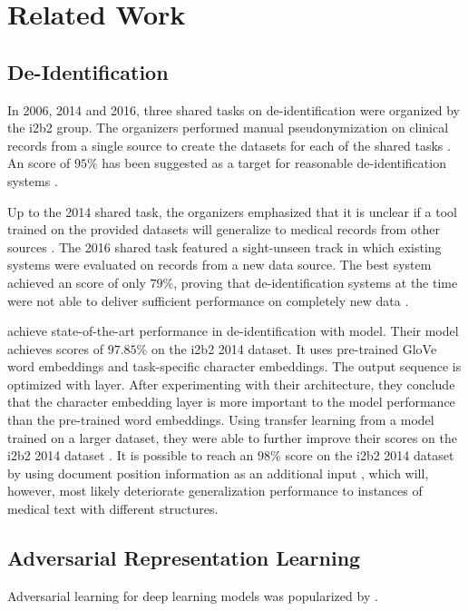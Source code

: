 
\section{Related Work}\label{sec:related}
%


\subsection{De-Identification}
In 2006, 2014 and 2016, three shared tasks on de-identification were organized by the i2b2 group.
%
The organizers performed manual pseudonymization on clinical records from a single source to create the datasets for each of the shared tasks \citep{stubbs2015annotating}.
%
An \fone score of $95\%$ has been suggested as a target for reasonable de-identification systems \citep{stubbs2015automated}.

%
Up to the 2014 shared task, the organizers emphasized that it is unclear if a tool trained on the provided datasets will generalize to medical records from other sources \citep{uzuner2007evaluating,stubbs2015automated}.
%
The 2016 shared task featured a sight-unseen track in which existing systems were evaluated on records from a new data source.
%
The best system achieved an \fone score of only $79\%$, proving that de-identification systems at the time were not able to deliver sufficient performance on completely new data \citep{stubbs2017identification}.

%
\citet{dernoncourt2017identification} achieve state-of-the-art performance in de-identification with  model.
%
Their model achieves \fone scores of $97.85\%$ on the i2b2 2014 dataset.
%
It uses pre-trained GloVe word embeddings and task-specific character embeddings.
%
The output sequence is optimized with  layer.
%
After experimenting with their architecture, they conclude that the character embedding layer is more important to the model performance than the pre-trained word embeddings.
%
Using transfer learning from a model trained on a larger dataset, they were able to further improve their scores on the i2b2 2014 dataset \citep{lee2017transfer}.
%
It is possible to reach an $98\%$ \fone score on the i2b2 2014 dataset by using document position information as an additional input \citep{zhao2018leveraging}, which will, however, most likely deteriorate generalization performance to instances of medical text with different structures.

\subsection{Adversarial Representation Learning}
%
Adversarial learning for deep learning models was popularized by \citet{goodfellow2014generative}.
%

